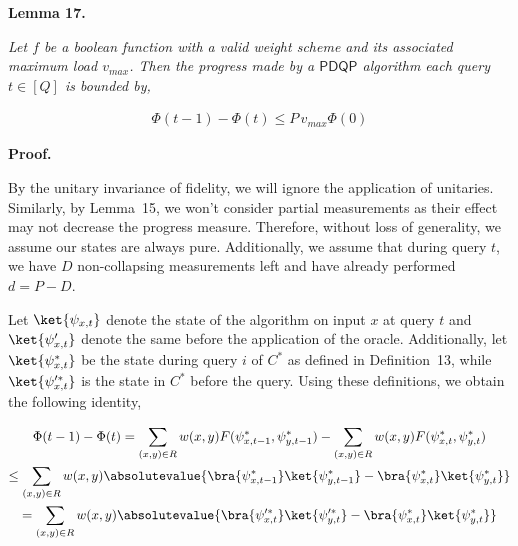 

\par\medskip\noindent\textbf{
\textbf{Lemma 17}\textbf{.}
}\par



\emph{Let $f$ be a boolean function with a valid weight scheme and its associated maximum load $v_{max}$. Then the progress made by a $\mathsf{PDQP}$ algorithm each query $t\in[Q]$ is bounded by,}\par


\[\begin{gathered}
\displaystyle\Phi(t-1)-\Phi(t)\leq P\,v_{max}\Phi(0)
\end{gathered}\]







\par\medskip\noindent\textbf{Proof.}\par




By the unitary invariance of fidelity, we will ignore the application of unitaries. Similarly, by Lemma 15, we won’t consider partial measurements as their effect may not decrease the progress measure. Therefore, without loss of generality, we assume our states are always pure. Additionally, we assume that during query $t$, we have $D$ non-collapsing measurements left and have already performed $d=P-D$.\par




Let $\ket{\psi_{x,t}}$ denote the state of the algorithm on input $x$ at query $t$ and $\ket{\psi_{x,t}^{\prime}}$ denote the same before the application of the oracle. Additionally, let $\ket{\psi_{x,t}^{*}}$ be the state during query $i$ of $C^{*}$ as defined in Definition 13, while $\ket{\psi_{x,t}^{\prime*}}$ is the state in $C^{*}$ before the query. Using these definitions, we obtain the following identity,\par


\[\begin{gathered}
\displaystyle\Phi(t-1)-\Phi(t) \displaystyle=\sum_{(x,y)\in R}w(x,y)F(\psi_{x,t-1}^{*},\psi_{y,t-1}^{*})-\sum_{(x,y)\in R}w(x,y)F(\psi_{x,t}^{*},\psi_{y,t}^{*}) \\
\displaystyle\leq\sum_{(x,y)\in R}w(x,y)\absolutevalue{\bra{\psi_{x,t-1}^{*}}\ket{\psi_{y,t-1}^{*}}-\bra{\psi_{x,t}^{*}}\ket{\psi_{y,t}^{*}}} \\
\displaystyle=\sum_{(x,y)\in R}w(x,y)\absolutevalue{\bra{\psi_{x,t}^{\prime*}}\ket{\psi_{y,t}^{\prime*}}-\bra{\psi_{x,t}^{*}}\ket{\psi_{y,t}^{*}}}
\end{gathered}\]




